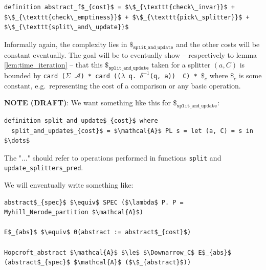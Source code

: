 \documentclass[12pt, a4 paper]{article}
\theoremstyle{definition}
\begin{document}
\begin{lstlisting}[language=Isabelle]
definition abstract_f$_{cost}$ = $\$_{\texttt{check\_invar}}$ + $\$_{\texttt{check\_emptiness}}$ + $\$_{\texttt{pick\_splitter}}$ + $\$_{\texttt{split\_and\_update}}$
\end{lstlisting}

Informally again, the complexity lies in $\$_{\texttt{split\_and\_update}}$ and the other costs will be constant eventually. The goal will be to eventually show -- respectively to lemma \ref{lem:time_iteration} -- that this $\$_{\texttt{split\_and\_update}}$ taken for a splitter $(a, C)$ is bounded by \texttt{card ($\Sigma$ $\mathcal{A}$) * card (($\lambda$ q. $\delta^{-1}$(q, a)) \textasciigrave\ C) * $\$_c$} where $\$_c$ is some constant, e.g.\ representing the cost of a comparison or any basic operation.

\vfill

{\bf NOTE (DRAFT)}: We want something like this for $\$_{\texttt{split\_and\_update}}$:
\begin{lstlisting}[language=Isabelle]
definition split_and_update$_{cost}$ where
  split_and_update$_{cost}$ = $\mathcal{A}$ PL s = let (a, C) = s in $\dots$
\end{lstlisting}
The "$\dots$" should refer to operations performed in functions \texttt{split} and \texttt{update\_splitters\_pred}.

We will enventually write something like:
\begin{lstlisting}[language=Isabelle]
abstract$_{spec}$ $\equiv$ SPEC ($\lambda$ P. P = Myhill_Nerode_partition $\mathcal{A}$)

E$_{abs}$ $\equiv$ 0(abstract := abstract$_{cost}$)

Hopcroft_abstract $\mathcal{A}$ $\le$ $\Downarrow_C$ E$_{abs}$ (abstract$_{spec}$ $\mathcal{A}$ ($\$_{abstract}$))
\end{lstlisting}


% 

\pagebreak


\end{document}
